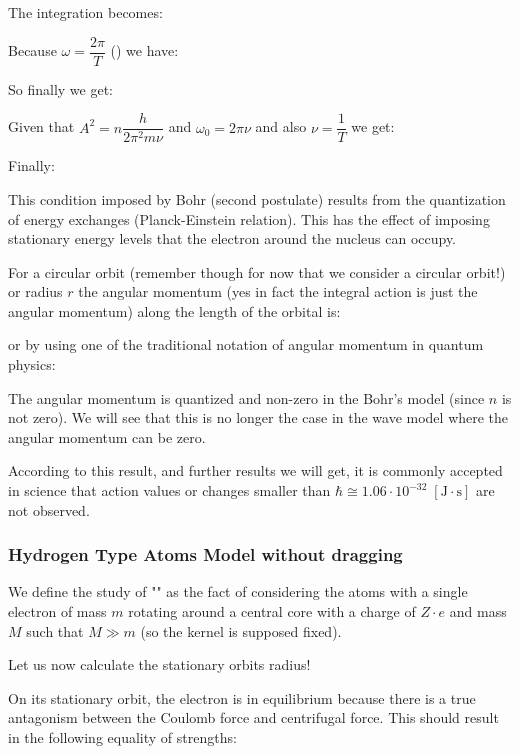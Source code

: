 The integration becomes:
	
Because $\omega=\dfrac{2\pi}{T}$ () we have:
	
So finally we get:
	
Given that $A^2=n\dfrac{h}{2\pi^2m\nu}$ and $\omega_0=2\pi\nu$ and also $\nu=\dfrac{1}{T}$ we get:
	
Finally:
	
This condition imposed by Bohr (second postulate) results from the quantization of energy exchanges (Planck-Einstein relation). This has the effect of imposing stationary energy levels that the electron around the nucleus can occupy.

For a circular orbit (remember though for now that we consider a circular orbit!) or radius $r$ the angular momentum (yes in fact the integral action is just the angular momentum) along the length of the orbital is:
	
or by using one of the traditional notation of angular momentum in quantum physics\label{quantized angular momentum}:
	
The angular momentum is quantized and non-zero in the Bohr's model (since $n$ is not zero). We will see that this is no longer the case in the wave model where the angular momentum can be zero.

	According to this result, and further results we will get, it is commonly accepted in science that action values or changes smaller than $\hbar\cong 1.06\cdot 10^{-32}\;[\text{J}\cdot \text{s}]$ are not observed.

	\subsubsection{Hydrogen Type Atoms Model without dragging}
	
	We define the study of "" as the fact of considering the atoms with a single electron of mass $m$ rotating around a central core with a charge of $Z \cdot e$ and mass $M$ such that $M \gg m$ (so the kernel is supposed fixed).
	
Let us now calculate the stationary orbits radius!

On its stationary orbit, the electron is in equilibrium because there is a true antagonism between the Coulomb force and centrifugal force. This should result in the following equality of strengths:
	
